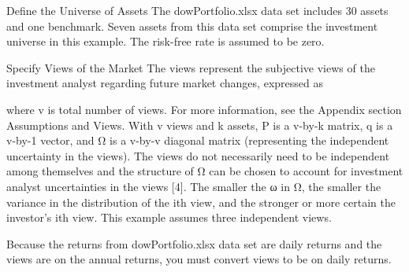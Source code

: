Define the Universe of Assets
The dowPortfolio.xlsx data set includes 30 assets and one benchmark. Seven assets from this data set comprise the investment universe in this example. The risk-free rate is assumed to be zero.

%


Specify Views of the Market
The views represent the subjective views of the investment analyst regarding future market changes, expressed as

where v is total number of views. For more information, see the Appendix section Assumptions and Views. With v views and k assets, P is a v-by-k matrix, q is a v-by-1 vector, and Ω is a v-by-v diagonal matrix (representing the independent uncertainty in the views). The views do not necessarily need to be independent among themselves and the structure of Ω can be chosen to account for investment analyst uncertainties in the views [4]. The smaller the ω
in Ω, the smaller the variance in the distribution of the ith view, and the stronger or more certain the investor's ith view. This example assumes three independent views.
%
%
%

%
%
%
%

Because the returns from dowPortfolio.xlsx data set are daily returns and the views are on the annual returns, you must convert views to be on daily returns.

